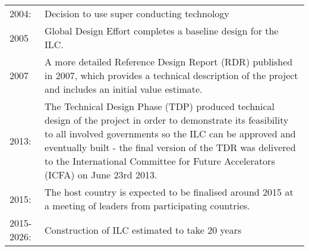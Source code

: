\begin{tabular}{p{2cm} p{12.5cm}}

2004: & Decision to use super conducting technology \\
2005 & Global Design Effort completes a baseline design for the ILC. \\
2007 & A more detailed Reference Design Report (RDR) published in 2007, which provides a technical description of the project and includes an initial value estimate. \\
2013: & The Technical Design Phase (TDP) produced technical design of the project in order to demonstrate its feasibility to all involved governments so the ILC can be approved and eventually built - the final version of the TDR was delivered to the International Committee for Future Accelerators (ICFA) on June 23rd 2013. \\
2015: & The host country is expected to be finalised around 2015 at a meeting of leaders from participating countries. \\
2015-2026: & Construction of ILC estimated to take 20 years \\

\end{tabular}
